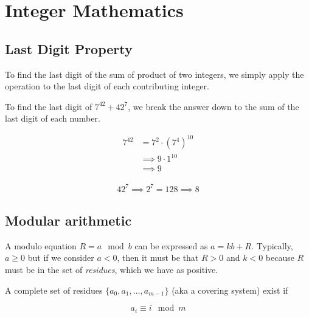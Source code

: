 \section{Integer Mathematics}

\subsection{Last Digit Property}

To find the last digit of the sum of product of two integers,
we simply apply the operation to the last digit of each contributing integer.

\begin{example}
    To find the last digit of $7^{42}+42^7$, we break the answer
    down to the sum of the last digit of each number.
    \begin{figure}[H]
        \begin{minipage}[t]{.45\textwidth}
            \begin{align*}
                7^{42} &= 7^2\cdot (7^{4})^{10}\\
                &\implies 9\cdot 1^{10}\\
                &\implies 9
            \end{align*}
        \end{minipage}
        \begin{minipage}[t]{.45\textwidth}
            \begin{align*}
                42^7\implies 2^7=128\implies 8
            \end{align*}
        \end{minipage}
    \end{figure}
\end{example}

\subsection{Modular arithmetic}

A modulo equation $R=a\mod b$ can be expressed as $a=kb + R$.
Typically, $a\geq 0$ but if we consider $a<0$, then it must be that $R>0$ and $k<0$
because $R$ must be in the set of \textit{residues}, which we have as positive.

A complete set of residues $\{a_0,a_1,\ldots,a_{m-1}\}$ (aka a covering system) exist
if

\begin{equation*}
    a_i\equiv i\mod m
\end{equation*}

